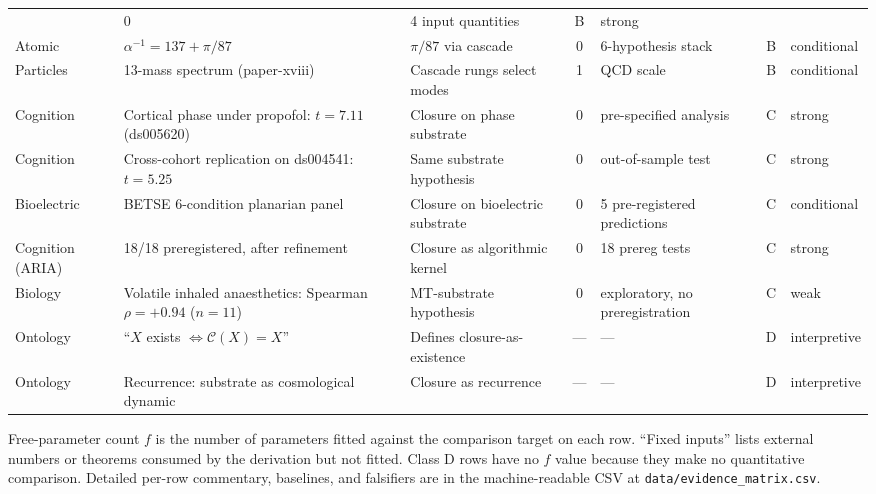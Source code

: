 \documentclass[11pt,a4paper]{article}
\begin{document}
\begin{small}
\begin{longtable}{p{2.3cm}p{4.0cm}p{3.2cm}cp{2.0cm}cl}
            & 0 & 4 input quantities
            & B & strong \\
\addlinespace
Atomic & $\alpha^{-1} = 137 + \pi/87$
            & $\pi/87$ via cascade
            & 0 & 6-hypothesis stack
            & B & conditional \\
\addlinespace
Particles & 13-mass spectrum (paper-xviii)
            & Cascade rungs select modes
            & 1 & QCD scale
            & B & conditional \\
\addlinespace
Cognition & Cortical phase under propofol: $t=7.11$ (ds005620)
            & Closure on phase substrate
            & 0 & pre-specified analysis
            & C & strong \\
\addlinespace
Cognition & Cross-cohort replication on ds004541: $t = 5.25$
            & Same substrate hypothesis
            & 0 & out-of-sample test
            & C & strong \\
\addlinespace
Bioelectric & BETSE 6-condition planarian panel
            & Closure on bioelectric substrate
            & 0 & 5 pre-registered predictions
            & C & conditional \\
\addlinespace
Cognition (ARIA) & 18/18 preregistered, after refinement
            & Closure as algorithmic kernel
            & 0 & 18 prereg tests & C & strong \\
\addlinespace
Biology & Volatile inhaled anaesthetics: Spearman $\rho = +0.94$ ($n=11$)
            & MT-substrate hypothesis
            & 0 & exploratory, no preregistration
            & C & weak \\
\addlinespace
Ontology & ``$X$ exists $\iff \mathcal{C}(X) = X$''
            & Defines closure-as-existence
            & --- & ---
            & D & interpretive \\
\addlinespace
Ontology & Recurrence: substrate as cosmological dynamic
            & Closure as recurrence
            & --- & ---
            & D & interpretive \\
\bottomrule
\end{longtable}
\end{small}

\bigskip

\noindent
Free-parameter count $f$ is the number of parameters fitted against
the comparison target on each row. ``Fixed inputs'' lists external
numbers or theorems consumed by the derivation but not fitted.
Class D rows have no $f$ value because they make no quantitative
comparison. Detailed per-row commentary, baselines, and falsifiers
are in the machine-readable CSV at
\texttt{data/evidence\_matrix.csv}.
\end{document}
